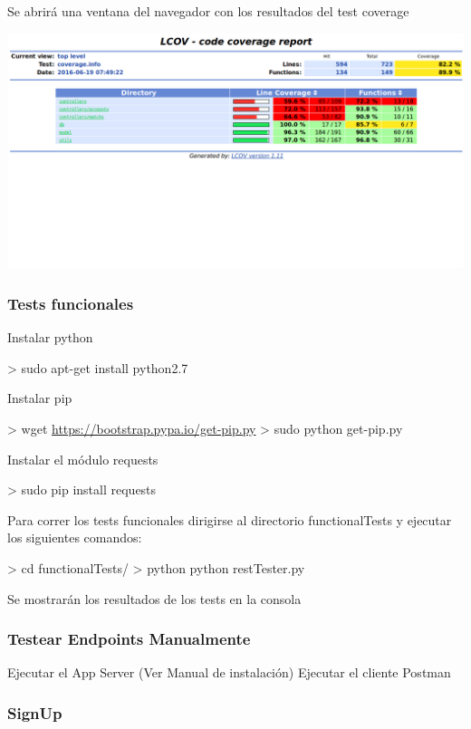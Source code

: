 \documentclass[letterpaper,10pt,english]{sphinxmanual}
\begin{document}
Se abrirá una ventana del navegador con los resultados del test coverage

\includegraphics{coverage.png}


\subsubsection{Tests funcionales}
\label{manuals:tests-funcionales}
Instalar python

\textgreater{} sudo apt-get install python2.7

Instalar pip

\textgreater{} wget \href{https://bootstrap.pypa.io/get-pip.py}{https://bootstrap.pypa.io/get-pip.py}
\textgreater{} sudo python get-pip.py

Instalar el módulo requests

\textgreater{} sudo pip install requests

Para correr los tests funcionales dirigirse al directorio functionalTests y ejecutar los siguientes comandos:

\textgreater{} cd functionalTests/
\textgreater{} python python restTester.py

Se mostrarán los resultados de los tests en la consola


\subsubsection{Testear Endpoints Manualmente}
\label{manuals:testear-endpoints-manualmente}
Ejecutar el App Server (Ver Manual de instalación)
Ejecutar el cliente Postman


\subsubsection{SignUp}
\label{manuals:id3}
\end{document}
